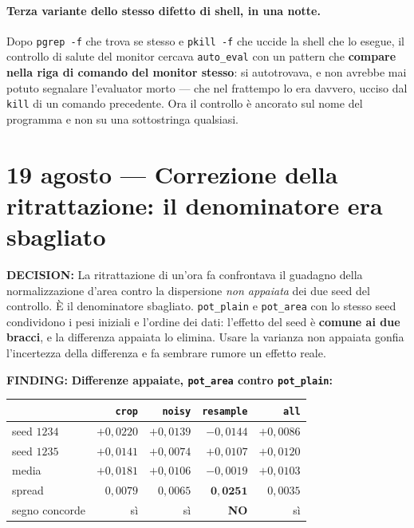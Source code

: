 \documentclass[11pt,a4paper]{article}
\newcommand{\finding}[1]{\textcolor{finding}{\textbf{FINDING:}} #1}
\newcommand{\decision}[1]{\textcolor{decision}{\textbf{DECISION:}} #1}
\begin{document}
\paragraph{Terza variante dello stesso difetto di shell, in una notte.} Dopo \texttt{pgrep -f}
che trova se stesso e \texttt{pkill -f} che uccide la shell che lo esegue, il controllo di salute
del monitor cercava \texttt{auto\_eval} con un pattern che \textbf{compare nella riga di comando
del monitor stesso}: si autotrovava, e non avrebbe mai potuto segnalare l'evaluator morto ---
che nel frattempo lo era davvero, ucciso dal \texttt{kill} di un comando precedente. Ora il
controllo \`e ancorato sul nome del programma e non su una sottostringa qualsiasi.


\section{19 agosto --- Correzione della ritrattazione: il denominatore era sbagliato}

\decision{La ritrattazione di un'ora fa confrontava il guadagno della normalizzazione d'area
contro la dispersione \emph{non appaiata} dei due seed del controllo. \`E il denominatore
sbagliato. \texttt{pot\_plain} e \texttt{pot\_area} con lo stesso seed condividono i pesi
iniziali e l'ordine dei dati: l'effetto del seed \`e \textbf{comune ai due bracci}, e la
differenza appaiata lo elimina. Usare la varianza non appaiata gonfia l'incertezza della
differenza e fa sembrare rumore un effetto reale.}

\finding{\textbf{Differenze appaiate, \texttt{pot\_area} contro \texttt{pot\_plain}:}}

\begin{center}\small
\begin{tabular}{lrrrr}
\toprule
 & \texttt{crop} & \texttt{noisy} & \texttt{resample} & \texttt{all} \\
\midrule
seed $1234$ & $+0{,}0220$ & $+0{,}0139$ & $-0{,}0144$ & $+0{,}0086$ \\
seed $1235$ & $+0{,}0141$ & $+0{,}0074$ & $+0{,}0107$ & $+0{,}0120$ \\
\midrule
media       & $+0{,}0181$ & $+0{,}0106$ & $-0{,}0019$ & $+0{,}0103$ \\
spread      & $0{,}0079$ & $0{,}0065$ & $\mathbf{0{,}0251}$ & $0{,}0035$ \\
segno concorde & s\`i & s\`i & \textbf{NO} & s\`i \\
\bottomrule
\end{tabular}
\end{center}
\end{document}
